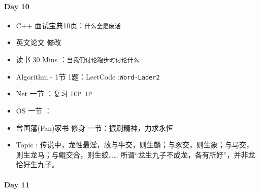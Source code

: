 \documentclass[UTF8,a4paper,8pt]{ctexart}
\begin{document}
 	 \paragraph{Day 10      \quad     }
	 	 \begin{itemize}[itemindent = 1em]
	 	 	\renewcommand\labelitemi{\makebox[0pt][l]{$\square$}\hspace{1em}} 
	 	 	\renewcommand\labelitemi{\makebox[0pt][l]{$\square$}\raisebox{.15ex}{\hspace{0.1em}$\checkmark$}}	 	
	 	 	\item   C++ 面试宝典10页：\verb|什么全是废话|
	 	 	\item   英文论文 修改
	 	 	
	 	 	\item   读书  30 Mins	：\verb|当我们讨论跑步时讨论什么|
	 	 	\item   Algorithm - 1节 1题：LeetCode :\verb|Word-Lader2|	
	 	 	\item   Net 一节 ：复习 \verb|TCP IP|	
	 	 	\renewcommand\labelitemi{\makebox[0pt][l]{$\square$}\hspace{1em}} 
	 	 	
	 	 	\item   OS  一节 ：
	 	 	
	 	 	\renewcommand\labelitemi{\makebox[0pt][l]{$\square$}\raisebox{.15ex}{\hspace{0.1em}$\checkmark$}}
	 	 	\item   曾国藩(Fan)家书 修身 一节：振刷精神，力求永恒
	 	 	\item   Topic : 传说中，龙性最淫，故与牛交，则生麟；与豕交，则生象；与马交，则生龙马；与鲲交合，则生蛟…… 所谓“龙生九子不成龙，各有所好”，并非龙恰好生九子。
	 	 \end{itemize}
 	 
 	 \paragraph{Day 11      \quad     }
	 	 
\end{document}
